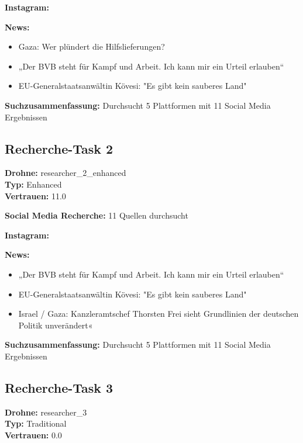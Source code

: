 \documentclass[12pt,a4paper]{article}
\begin{document}
\textbf{Instagram:}
\begin{itemize}
\end{itemize}

\textbf{News:}
\begin{itemize}
\item Gaza: Wer plündert die Hilfslieferungen?
\item „Der BVB steht für Kampf und Arbeit. Ich kann mir ein Urteil erlauben“
\item EU-Generalstaatsanwältin Kövesi: "Es gibt kein sauberes Land"
\end{itemize}

\textbf{Suchzusammenfassung:} Durchsucht 5 Plattformen mit 11 Social Media Ergebnissen

\subsection{Recherche-Task 2}

\textbf{Drohne:} researcher\_2\_enhanced\\
\textbf{Typ:} Enhanced\\
\textbf{Vertrauen:} 11.0%

\textbf{Social Media Recherche:} 11 Quellen durchsucht

\textbf{Instagram:}
\begin{itemize}
\end{itemize}

\textbf{News:}
\begin{itemize}
\item „Der BVB steht für Kampf und Arbeit. Ich kann mir ein Urteil erlauben“
\item EU-Generalstaatsanwältin Kövesi: "Es gibt kein sauberes Land"
\item Israel / Gaza: Kanzleramtschef Thorsten Frei sieht Grundlinien der deutschen Politik unverändert«
\end{itemize}

\textbf{Suchzusammenfassung:} Durchsucht 5 Plattformen mit 11 Social Media Ergebnissen

\subsection{Recherche-Task 3}

\textbf{Drohne:} researcher\_3\\
\textbf{Typ:} Traditional\\
\textbf{Vertrauen:} 0.0%
\end{document}
